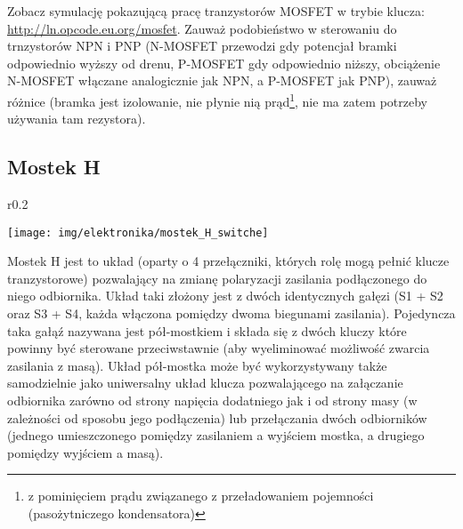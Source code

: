 \documentclass{pdfBooklets}
\begin{document}
Zobacz symulację pokazującą pracę tranzystorów MOSFET w trybie klucza: \url{http://ln.opcode.eu.org/mosfet}.
Zauważ podobieństwo w sterowaniu do trnzystorów NPN i PNP (N-MOSFET przewodzi gdy potencjał bramki odpowiednio wyższy od drenu, P-MOSFET gdy odpowiednio niższy, obciążenie N-MOSFET włączane analogicznie jak NPN, a P-MOSFET jak PNP),
	zauważ różnice (bramka jest izolowanie, nie płynie nią prąd\footnote{z pominięciem prądu związanego z przeładowaniem pojemności (pasożytniczego kondensatora)}, nie ma zatem potrzeby używania tam rezystora).


\subsection{Mostek H}

\begin{wrapfigure}{r}{0.2\textwidth}
  \begin{center}
    \vspace{-27pt}
    \texttt{[image: img/elektronika/mostek\_H\_switche]}
    \vspace{-27pt}
  \end{center}
\end{wrapfigure}

Mostek H jest to układ (oparty o 4 przełączniki, których rolę mogą pełnić klucze tranzystorowe) pozwalający na zmianę polaryzacji zasilania podłączonego do niego odbiornika. Układ taki złożony jest z dwóch identycznych gałęzi (S1 + S2 oraz S3 + S4, każda włączona pomiędzy dwoma biegunami zasilania). Pojedyncza taka gałąź nazywana jest pół-mostkiem i składa się z dwóch kluczy które powinny być sterowane przeciwstawnie (aby wyeliminować możliwość zwarcia zasilania z masą). Układ pół-mostka może być wykorzystywany także samodzielnie jako uniwersalny układ klucza pozwalającego na załączanie odbiornika zarówno od strony napięcia dodatniego jak i od strony masy (w zależności od sposobu jego podłączenia) lub przełączania dwóch odbiorników (jednego umieszczonego pomiędzy zasilaniem a wyjściem mostka, a drugiego pomiędzy wyjściem a masą).
\end{document}
